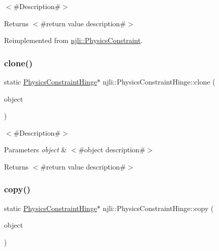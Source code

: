 $<$\#\+Description\#$>$

\begin{DoxyReturn}{Returns}
$<$\#return value description\#$>$ 
\end{DoxyReturn}


Reimplemented from \mbox{\hyperlink{classnjli_1_1_physics_constraint_aeda6c35ab271897cfe3192870d4ac7a4}{njli\+::\+Physics\+Constraint}}.

\mbox{\label{classnjli_1_1_physics_constraint_hinge_a633ccb73ed4e5522fc71e55759bb31e0}} 
\subsubsection{\texorpdfstring{clone()}{clone()}}
{\footnotesize\ttfamily static \mbox{\hyperlink{classnjli_1_1_physics_constraint_hinge}{Physics\+Constraint\+Hinge}}$\ast$ njli\+::\+Physics\+Constraint\+Hinge\+::clone (\begin{DoxyParamCaption}\item[{const \mbox{\hyperlink{classnjli_1_1_physics_constraint_hinge}{Physics\+Constraint\+Hinge}} \&}]{object }\end{DoxyParamCaption})\hspace{0.3cm}{\ttfamily [static]}}

$<$\#\+Description\#$>$


\begin{DoxyParams}{Parameters}
{\em object} & $<$\#object description\#$>$\\
\hline
\end{DoxyParams}
\begin{DoxyReturn}{Returns}
$<$\#return value description\#$>$ 
\end{DoxyReturn}
\mbox{\label{classnjli_1_1_physics_constraint_hinge_a202f0ee9f280a7c0e691239c9b373c19}} 
\subsubsection{\texorpdfstring{copy()}{copy()}}
{\footnotesize\ttfamily static \mbox{\hyperlink{classnjli_1_1_physics_constraint_hinge}{Physics\+Constraint\+Hinge}}$\ast$ njli\+::\+Physics\+Constraint\+Hinge\+::copy (\begin{DoxyParamCaption}\item[{const \mbox{\hyperlink{classnjli_1_1_physics_constraint_hinge}{Physics\+Constraint\+Hinge}} \&}]{object }\end{DoxyParamCaption})\hspace{0.3cm}{\ttfamily [static]}}

